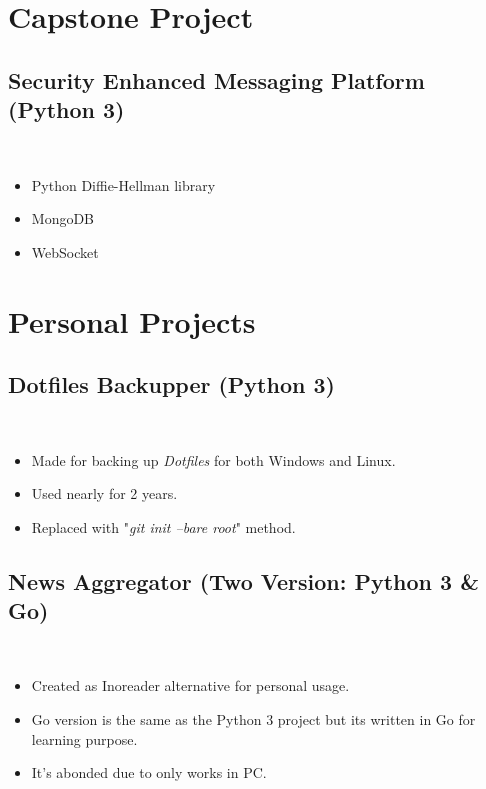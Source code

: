 \documentclass[a4paper, 9pt]{extarticle}
\begin{document}
\maketitle{}
\myeducation{}
\myexperience{}

\section{Capstone Project}
\subsection{Security Enhanced Messaging Platform (Python 3)} \hfill \\
\begin{itemize}
\item Python Diffie-Hellman library
\item MongoDB
\item WebSocket
\end{itemize}

\section{Personal Projects}
\subsection{Dotfiles Backupper (Python 3)} \hfill \\
\begin{itemize}
\item Made for backing up \emph{Dotfiles} for both Windows and Linux.
\item Used nearly for 2 years.
\item Replaced with "\emph{git init --bare root}" method.
\end{itemize}

\subsection{News Aggregator (Two Version: Python 3 \& Go)} \hfill \\
\begin{itemize}
\item Created as Inoreader alternative for personal usage.
\item Go version is the same as the Python 3 project but its written in Go
	for learning purpose.
\item It's abonded due to only works in PC.
\end{itemize}
\end{document}
